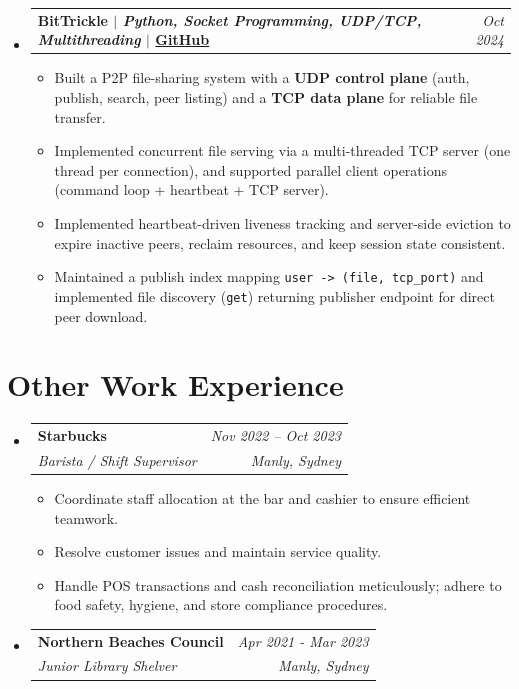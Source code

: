 \documentclass[10pt, a4paper]{article}
\makeatletter
\newcommand{\resumeItem}[1]{
  \item\small{
    {#1 \vspace{-2pt}}
  }
}
\newcommand{\resumeSubheading}[4]{
  \vspace{-1pt}\item
    \begin{tabular*}{0.97\textwidth}[t]{l@{\extracolsep{\fill}}r}
      \textbf{#1} & \textit{\small #2} \\
      \textit{\small #3} & \textit{\small #4} \\
    \end{tabular*}\vspace{-5pt}
}
\newcommand{\resumeProjectHeading}[2]{
    \vspace{-1pt}\item
    \begin{tabular*}{0.97\textwidth}{l@{\extracolsep{\fill}}r}
      \textbf{#1} & \textit{\small #2} \\
    \end{tabular*}\vspace{-5pt}
}
\newenvironment{resumeItemList}{\begin{itemize}[leftmargin=0.15in, label={}]}{\end{itemize}}
\makeatother
\begin{document}
\begin{resumeItemList}
    \resumeProjectHeading
      {\textbf{BitTrickle} $|$ \emph{Python, Socket Programming, UDP/TCP, Multithreading} $|$ \href{https://github.com/Zhejian-Zheng/tcp-udp-simulator}{\textbf{GitHub}}}{Oct 2024}
      \begin{itemize}[leftmargin=0.15in]
        \resumeItem{Built a P2P file-sharing system with a \textbf{UDP control plane} (auth, publish, search, peer listing) and a \textbf{TCP data plane} for reliable file transfer.}
        \resumeItem{Implemented concurrent file serving via a multi-threaded TCP server (one thread per connection), and supported parallel client operations (command loop + heartbeat + TCP server).}
        \resumeItem{Implemented heartbeat-driven liveness tracking and server-side eviction to expire inactive peers, reclaim resources, and keep session state consistent.}
        \resumeItem{Maintained a publish index mapping \texttt{user -> (file, tcp\_port)} and implemented file discovery (\texttt{get}) returning publisher endpoint for direct peer download.}
      \end{itemize}

  \end{resumeItemList}

\section{Other Work Experience}
\begin{resumeItemList}

  \resumeSubheading
    {Starbucks}{Nov 2022 -- Oct 2023}
    {Barista / Shift Supervisor}{Manly, Sydney}
    \begin{itemize}[leftmargin=0.15in]
      \resumeItem{Coordinate staff allocation at the bar and cashier to ensure efficient teamwork.}
      \resumeItem{Resolve customer issues and maintain service quality.}
      \resumeItem{Handle POS transactions and cash reconciliation meticulously; adhere to food safety, hygiene, and store compliance procedures.}
    \end{itemize}

    \resumeSubheading
    {Northern Beaches Council}{Apr 2021 - Mar 2023}
    {Junior Library Shelver}{Manly, Sydney}
    \begin{itemize}[leftmargin=0.15in] 
    \end{itemize}

\end{resumeItemList}

\end{document}
